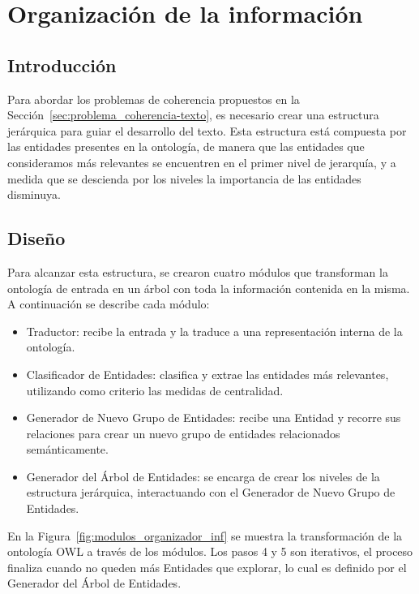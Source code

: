 \chapter{Organización de la información}

\section{Introducción}
Para abordar los problemas de coherencia propuestos en la Sección~\ref{sec:problema_coherencia-texto}, es necesario crear una estructura jerárquica para guiar el desarrollo del texto. Esta estructura está compuesta por las entidades presentes en la ontología, de manera que las entidades que consideramos más relevantes se encuentren en el primer nivel de jerarquía, y a medida que se descienda por los niveles la importancia de las entidades disminuya.

\section{Diseño}
Para alcanzar esta estructura, se crearon cuatro módulos que transforman la ontología de entrada en un árbol con toda la información contenida en la misma.
A continuación se describe cada módulo:
\begin{itemize}
    \item Traductor: recibe la entrada y la traduce a una representación interna de la ontología.
    \item Clasificador de Entidades: clasifica y extrae las entidades más relevantes, utilizando como criterio las medidas de centralidad.
    \item Generador de Nuevo Grupo de Entidades: recibe una Entidad y recorre sus relaciones para crear un nuevo grupo de entidades relacionados semánticamente.
    \item Generador del Árbol de Entidades: se encarga de crear los niveles de la estructura jerárquica, interactuando con el Generador de Nuevo Grupo de Entidades.
    
\end{itemize}

En la Figura~\ref{fig:modulos_organizador_inf} se muestra la transformación de la ontología OWL a través de los módulos. Los pasos 4 y 5 son iterativos, el proceso finaliza cuando no queden más Entidades que explorar, lo cual es definido por el Generador del Árbol de Entidades.

